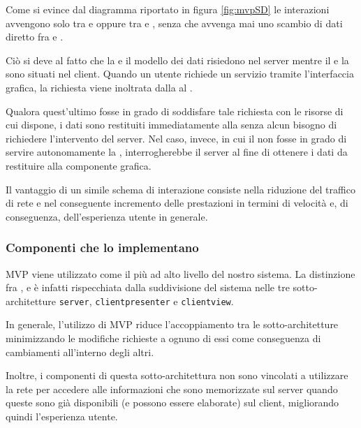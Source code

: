 Come si evince dal diagramma riportato in figura \ref{fig:mvpSD} le interazioni avvengono solo tra  e  oppure tra  e , senza che avvenga mai uno scambio di dati diretto fra  e .

Ciò si deve al fatto che la  e il modello dei dati risiedono nel server mentre il  e la  sono situati nel client. Quando un utente richiede un servizio tramite l'interfaccia grafica, la richiesta viene inoltrata dalla  al .

Qualora quest'ultimo fosse in grado di soddisfare tale richiesta con le risorse di cui dispone, i dati sono restituiti immediatamente alla  senza alcun bisogno di richiedere l'intervento del server. Nel caso, invece, in cui il  non fosse in grado di servire autonomamente la , interrogherebbe il server al fine di ottenere i dati da restituire alla componente grafica.

Il vantaggio di un simile schema di interazione consiste nella riduzione del traffico di rete e nel conseguente incremento delle prestazioni in termini di velocità e, di conseguenza, dell'esperienza utente in generale.

\subsubsection{Componenti che lo implementano}
MVP viene utilizzato come il  più ad alto livello del nostro sistema. La distinzione fra ,  e  è infatti rispecchiata dalla suddivisione del sistema nelle tre sotto-architetture \texttt{server}, \texttt{clientpresenter} e \texttt{clientview}.

In generale, l'utilizzo di MVP riduce l'accoppiamento tra le sotto-architetture minimizzando le modifiche richieste a ognuno di essi come conseguenza di cambiamenti all'interno degli altri.

Inoltre, i componenti di questa sotto-architettura non sono vincolati a utilizzare la rete per accedere alle informazioni che sono memorizzate sul server quando queste sono già disponibili (e possono essere elaborate) sul client, migliorando quindi l'esperienza utente.

